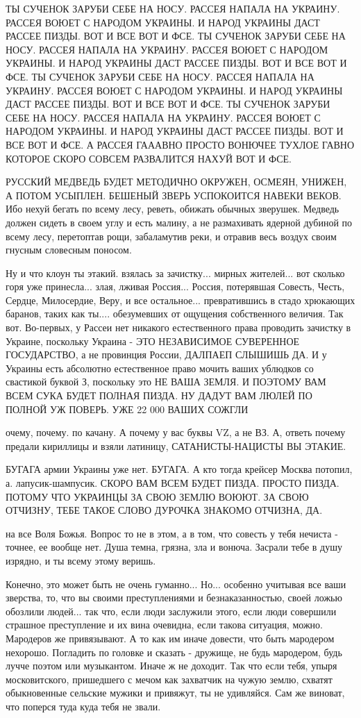 ТЫ СУЧЕНОК ЗАРУБИ СЕБЕ НА НОСУ. РАССЕЯ НАПАЛА НА УКРАИНУ. РАССЕЯ ВОЮЕТ С НАРОДОМ УКРАИНЫ. И НАРОД УКРАИНЫ ДАСТ РАССЕЕ ПИЗДЫ. ВОТ И ВСЕ ВОТ И ФСЕ. 
ТЫ СУЧЕНОК ЗАРУБИ СЕБЕ НА НОСУ. РАССЕЯ НАПАЛА НА УКРАИНУ. РАССЕЯ ВОЮЕТ С НАРОДОМ УКРАИНЫ. И НАРОД УКРАИНЫ ДАСТ РАССЕЕ ПИЗДЫ. ВОТ И ВСЕ ВОТ И ФСЕ. 
ТЫ СУЧЕНОК ЗАРУБИ СЕБЕ НА НОСУ. РАССЕЯ НАПАЛА НА УКРАИНУ. РАССЕЯ ВОЮЕТ С НАРОДОМ УКРАИНЫ. И НАРОД УКРАИНЫ ДАСТ РАССЕЕ ПИЗДЫ. ВОТ И ВСЕ ВОТ И ФСЕ. 
ТЫ СУЧЕНОК ЗАРУБИ СЕБЕ НА НОСУ. РАССЕЯ НАПАЛА НА УКРАИНУ. РАССЕЯ ВОЮЕТ С НАРОДОМ УКРАИНЫ. И НАРОД УКРАИНЫ ДАСТ РАССЕЕ ПИЗДЫ. ВОТ И ВСЕ ВОТ И ФСЕ. 
А РАССЕЯ ГАААВНО ПРОСТО ВОНЮЧЕЕ ТУХЛОЕ ГАВНО КОТОРОЕ СКОРО СОВСЕМ РАЗВАЛИТСЯ НАХУЙ ВОТ И ФСЕ.

РУССКИЙ МЕДВЕДЬ БУДЕТ МЕТОДИЧНО ОКРУЖЕН, ОСМЕЯН, УНИЖЕН, А ПОТОМ УСЫПЛЕН.
БЕШЕНЫЙ ЗВЕРЬ УСПОКОИТСЯ НАВЕКИ ВЕКОВ. Ибо нехуй бегать по всему лесу, реветь,
обижать обычных зверушек. Медведь должен сидеть в своем углу и есть малину, а
не размахивать ядерной дубиной по всему лесу, перетоптав рощи, забаламутив
реки, и отравив весь воздух своим гнусным словесным поносом.


Ну и что клоун ты этакий. взялась за зачистку... мирных жителей... вот сколько
горя уже принесла... злая, лживая Россия... Россия, потерявшая Совесть, Честь,
Сердце, Милосердие, Веру, и все остальное... превратившись в стадо хрюкающих
баранов, таких как ты.... обезумевших от ощущения собственного величия. Так
вот. Во-первых, у Рассеи нет никакого естественного права проводить зачистку в
Украине, поскольку Украина - ЭТО НЕЗАВИСИМОЕ СУВЕРЕННОЕ ГОСУДАРСТВО, а не
провинция России, ДАЛПАЕП СЛЫШИШЬ ДА. И у Украины есть абсолютно естественное
право мочить ваших ублюдков со свастикой буквой З, поскольку это НЕ ВАША ЗЕМЛЯ.
И ПОЭТОМУ ВАМ ВСЕМ СУКА БУДЕТ ПОЛНАЯ ПИЗДА. НУ ДАДУТ ВАМ ЛЮЛЕЙ ПО ПОЛНОЙ УЖ
ПОВЕРЬ. УЖЕ 22 000 ВАШИХ СОЖГЛИ

очему, почему. по качану. А почему у вас буквы VZ, а не ВЗ. А, ответь почему
предали кириллицы и взяли латиницу, САТАНИСТЫ-НАЦИСТЫ ВЫ ЭТАКИЕ.

БУГАГА армии Украины уже нет. БУГАГА. А кто тогда крейсер Москва потопил, а.
лапусик-шампусик. СКОРО ВАМ ВСЕМ БУДЕТ ПИЗДА. ПРОСТО ПИЗДА. ПОТОМУ ЧТО УКРАИНЦЫ ЗА СВОЮ
ЗЕМЛЮ ВОЮЮТ. ЗА СВОЮ ОТЧИЗНУ, ТЕБЕ ТАКОЕ СЛОВО ДУРОЧКА ЗНАКОМО ОТЧИЗНА, ДА.

на все Воля Божья. Вопрос то не в этом, а в том, что совесть у тебя нечиста -
точнее, ее вообще нет. Душа темна, грязна, зла и вонюча. Засрали тебе в душу
изрядно, и ты всему этому веришь.

Конечно, это может быть не очень гуманно... Но... особенно учитывая все ваши зверства, то, что вы своими преступлениями и безнаказанностью, своей ложью обозлили людей... так что, если люди заслужили этого, если люди совершили страшное преступление и их вина очевидна, если такова ситуация, можно. Мародеров же привязывают. А то как им иначе довести, что быть мародером нехорошо. Погладить по головке и сказать - дружище, не будь мародером, будь лучче поэтом или музыкантом. Иначе ж не доходит. Так что если тебя, упыря московитского, пришедшего с мечом как захватчик на чужую землю, схватят обыкновенные сельские мужики и привяжут, ты не удивляйся. Сам же виноват, что поперся туда куда тебя не звали.

